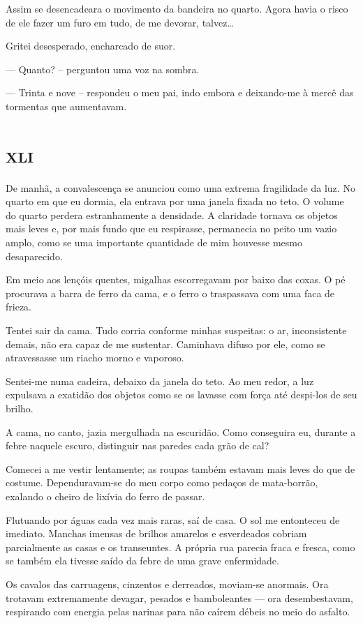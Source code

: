Assim se desencadeara o movimento da bandeira no quarto. Agora havia o risco de ele fazer um furo em tudo, de me devorar, talvez\dots

Gritei desesperado, encharcado de suor.

--- Quanto? -- perguntou uma voz na sombra.

--- Trinta e nove -- respondeu o meu pai, indo embora e deixando-me à mercê das tormentas que aumentavam.


\chapter*{\huge\centering\textsc{xli}}

De manhã, a convalescença se anunciou como uma extrema fragilidade da luz. No quarto em que eu dormia, ela entrava por uma janela fixada no teto. O volume do quarto perdera estranhamente a densidade. A claridade tornava os objetos mais leves e, por mais fundo que eu respirasse, permanecia no peito um vazio amplo, como se uma importante quantidade de mim houvesse mesmo desaparecido.

Em meio aos lençóis quentes, migalhas escorregavam por baixo das coxas. O pé procurava a barra de ferro da cama, e o ferro o traspassava com uma faca de frieza.

Tentei sair da cama. Tudo corria conforme minhas suspeitas: o ar, inconsistente demais, não era capaz de me sustentar. Caminhava difuso por ele, como se atravessasse um riacho morno e vaporoso.

Sentei-me numa cadeira, debaixo da janela do teto. Ao meu redor, a luz expulsava a exatidão dos objetos como se os lavasse com força até despi-los de seu brilho.

A cama, no canto, jazia mergulhada na escuridão. Como conseguira eu, durante a febre naquele escuro, distinguir nas paredes cada grão de cal?

Comecei a me vestir lentamente; as roupas também estavam mais leves do que de costume. Dependuravam-se do meu corpo como pedaços de mata-borrão, exalando o cheiro de lixívia do ferro de passar.

Flutuando por águas cada vez mais raras, saí de casa. O sol me entonteceu de imediato. Manchas imensas de brilhos amarelos e esverdeados cobriam parcialmente as casas e os transeuntes. A própria rua parecia fraca e fresca, como se também ela tivesse saído da febre de uma grave enfermidade.

Os cavalos das carruagens, cinzentos e derreados, moviam-se anormais. Ora trotavam extremamente devagar, pesados e bamboleantes --- ora desembestavam, respirando com energia pelas narinas para não caírem débeis no meio do asfalto.

